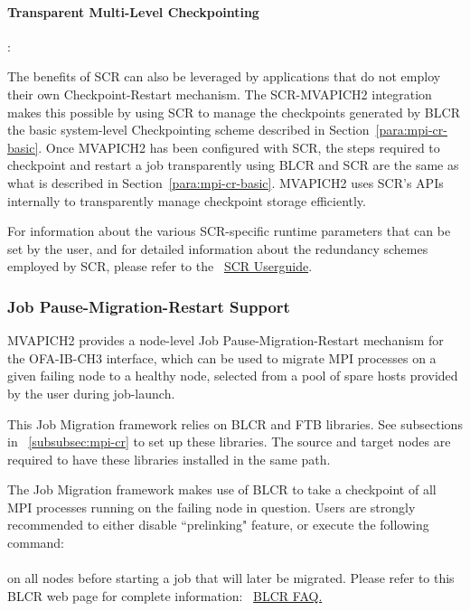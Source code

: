 \paragraph{Transparent Multi-Level Checkpointing}:

The benefits of SCR can also be leveraged by applications that do not employ
their own Checkpoint-Restart mechanism. The SCR-MVAPICH2 integration makes this
possible by using SCR to manage the checkpoints generated by BLCR the basic
system-level Checkpointing scheme described in Section~\ref{para:mpi-cr-basic}.
Once MVAPICH2 has been configured with SCR, the steps required to checkpoint and
restart a job transparently using BLCR and SCR are the same as what is described
in Section~\ref{para:mpi-cr-basic}. MVAPICH2 uses SCR's APIs internally to
transparently manage checkpoint storage efficiently.


For information about the various SCR-specific runtime parameters that can
be set by the user, and for detailed information about the redundancy schemes
employed by SCR, please refer to the
~\href{http://sourceforge.net/p/scalablecr/code/ci/b26dc6ec2310a694e3b7a0a4f85a9e2e26ee21fb/tree/doc/scr_users_manual.pdf?format=raw}{SCR
Userguide}.

\subsubsection{Job Pause-Migration-Restart Support}
\label{subsubsec:mpi-migration}

MVAPICH2 provides a node-level Job Pause-Migration-Restart mechanism for the
OFA-IB-CH3 interface, which can be used to migrate MPI processes on a given
failing node to a healthy node, selected from a pool of spare hosts provided by
the user during job-launch.

This Job Migration framework relies on BLCR and FTB libraries.  See subsections
in ~\ref{subsubsec:mpi-cr} to set up these libraries.  The source and target
nodes are required to have these libraries installed in the same path.

The Job Migration framework makes use of BLCR to take a checkpoint of all MPI
processes running on the failing node in question.  Users are strongly
recommended to either disable ``prelinking" feature, or execute the following
command:\\

\\

on all nodes before starting a job that will later be migrated.  Please refer to
this BLCR web page for complete information:
~\href{https://upc-bugs.lbl.gov//blcr/doc/html/FAQ.html\#prelink}{BLCR FAQ.}

